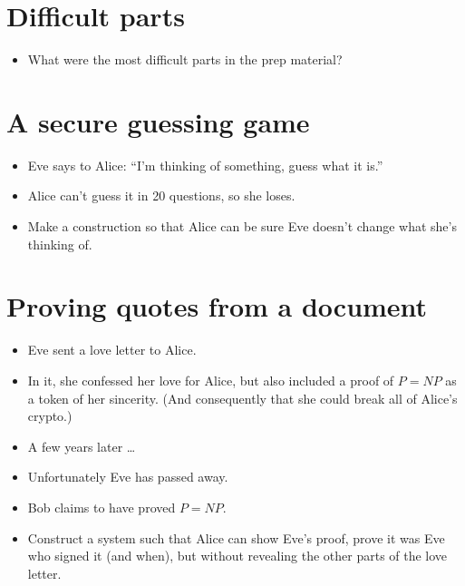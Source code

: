 \mode*

\section{Difficult parts}

\begin{frame}
  \begin{question}
    \begin{itemize}
      \item What were the most difficult parts in the prep material?
    \end{itemize}
  \end{question}
\end{frame}

\section{A secure guessing game}

\begin{frame}
  \begin{exercise}[20 questions]
    \begin{itemize}
      \item Eve says to Alice: \enquote{I'm thinking of something, guess what 
        it is.}
      \item Alice can't guess it in 20 questions, so she loses.
      \item Make a construction so that Alice can be sure Eve doesn't change 
        what she's thinking of.
    \end{itemize}
  \end{exercise}
\end{frame}

\section{Proving quotes from a document}

\begin{frame}
  \begin{exercise}
    \begin{itemize}
      \item Eve sent a love letter to Alice.
      \item In it, she confessed her love for Alice, but also included a proof 
        of \(P = NP\) as a token of her sincerity. (And consequently that she 
        could break all of Alice's crypto.)

        \pause

      \item A few years later \dots
      \item Unfortunately Eve has passed away.
      \item Bob claims to have proved \(P = NP\).
      \item Construct a system such that Alice can show Eve's proof, prove it 
        was Eve who signed it (and when), but without revealing the other parts 
        of the love letter.
    \end{itemize}
  \end{exercise}
\end{frame}


